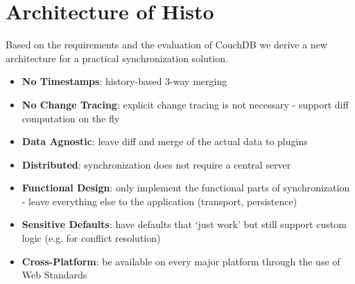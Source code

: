 
\section{Architecture of Histo}
\label{sec:main.histo}

Based on the requirements and the evaluation of CouchDB we derive a new architecture for a practical synchronization solution.

\begin{itemize}
\item
  \textbf{No Timestamps}: history-based 3-way merging
\item
  \textbf{No Change Tracing}: explicit change tracing is not necessary - support
  diff computation on the fly
\item
  \textbf{Data Agnostic}: leave diff and merge of the actual data to
  plugins
\item
  \textbf{Distributed}: synchronization does not require a central server
\item
  \textbf{Functional Design}: only implement the functional parts of synchronization - leave everything else to the application (transport, persistence)
\item
  \textbf{Sensitive Defaults}: have defaults that `just work' but
  still support custom logic (e.g. for conflict resolution)
\item
  \textbf{Cross-Platform}: be available on every major platform through the use of Web Standards
\end{itemize}